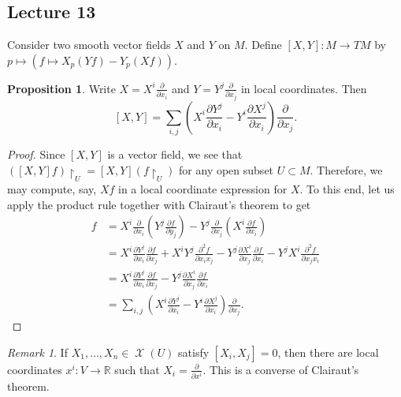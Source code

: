 \documentclass[10pt,letterpaper,cm]{nupset}
\theoremstyle{definition}
\theoremstyle{theorem}
\newtheorem{prop}[definition]{Proposition}
\theoremstyle{remark}
\newtheorem{remark}[definition]{Remark}
\newcommand{\R}{\mathbb R}
\newcommand{\1}{\mathbf{1}}
\newcommand{\0}{\vec 0}
\DeclareMathOperator{\vf}{\mathscr{X}}
\begin{document}
\subsection{Lecture 13}


Consider two smooth vector fields $X$ and $Y$ on $M$. Define $[X, Y] : M \to TM$ by $p\mapsto \left(f \mapsto X_p(Yf) - Y_p(Xf)\right)$.


\begin{prop}
Write $X = X^i\frac{\partial}{\partial{x_i}}$ and $Y = Y^j \frac{\partial}{\partial{x_j}}$ in local coordinates. Then $$[X, Y] = \sum_{i, j}\left(X^i \frac{\partial{Y^j}}{\partial{x_i}} - Y^i\frac{\partial{X^j}}{\partial{x_i}}\right)\frac{\partial}{\partial{x_j}}.$$
\end{prop}
\begin{proof}
Since $[X, Y]$ is a vector field, we see that $\left([X, Y]f\right) \restriction_U = [X, Y](f\restriction_U)$ for any open subset $U \subset M$. Therefore, we may compute, say, $Xf$ in a local coordinate expression for $X$.  To this end, let us apply the product rule together with Clairaut's theorem to get
\begin{align*}
[X, Y]f & = X^i \frac{\partial}{\partial{x_i}} \left(Y^j \frac{\partial{f}}{\partial{y_j}}\right) - Y^j \frac{\partial}{\partial{x_j}} \left(X^i \frac{\partial{f}}{\partial{x_i}}\right) 
\\ & =  X^i \frac{\partial{Y^j}}{\partial{x_i}}\frac{\partial{f}}{\partial{x_j}} + X^i Y^j \frac{\partial^2{f}}{\partial{x_i}{x_j}} - Y^j \frac{\partial{X^i}}{\partial{x_j}}\frac{\partial{f}}{\partial{x_i}} - Y^j X^i \frac{\partial^2{f}}{\partial{x_j}{x_i}}
 \\ & = X^i \frac{\partial{Y^j}}{\partial{x_i}}\frac{\partial{f}}{\partial{x_j}} -  Y^j \frac{\partial{X^i}}{\partial{x_j}}\frac{\partial{f}}{\partial{x_i}} 
 \\ & = \sum_{i, j}\left(X^i \frac{\partial{Y^j}}{\partial{x_i}} - Y^i\frac{\partial{X^j}}{\partial{x_i}}\right)\frac{\partial}{\partial{x_j}}.
 \end{align*}
\end{proof}

\begin{remark}
If $X_1, \ldots, X_n \in \vf(U)$ satisfy $[X_i, X_j]= 0$, then there are local coordinates $x^i : V \to \R$ such that $X_i  =\frac{\partial}{\partial{x^i}}$. This is a converse of Clairaut's theorem.
\end{remark}
\end{document}
